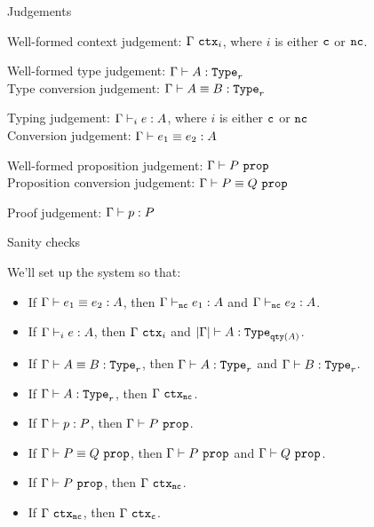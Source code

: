 \begin{frame}{Judgements}

Well-formed context judgement: $\ctx[i]{\Gamma}$, where $i$ is either $\texttt{c}$ or $\texttt{nc}$.

\vspace{2em}

Well-formed type judgement: $\type[\Gamma]{A}[r]$ \\
Type conversion judgement: $\typeconv[\Gamma]{A}{B}[r]$

\vspace{2em}

Typing judgement: $\typing[\Gamma][i]{e}{A}$, where $i$ is either $\texttt{c}$ or $\texttt{nc}$ \\
Conversion judgement: $\termconv[\Gamma]{e_1}{e_2}{A}$

\vspace{2em}

Well-formed proposition judgement: $\prop[\Gamma]{P}$ \\
Proposition conversion judgement: $\propconv[\Gamma]{P}{Q}$

\vspace{2em}

Proof judgement: $\proves[\Gamma]{p}{P}$

\end{frame}

\begin{frame}{Sanity checks}

We'll set up the system so that:

\begin{itemize}
  \item If $\termconv[\Gamma]{e_1}{e_2}{A}$, then $\typing[\Gamma][\noncomputable]{e_1}{A}$ and $\typing[\Gamma][\noncomputable]{e_2}{A}$.
  \item If $\typing[\Gamma][i]{e}{A}$, then $\ctx[i]{\Gamma}$ and $\type[\cartesianize{\Gamma}]{A}[\typeqty{A}]$.
  \item If $\typeconv[\Gamma]{A}{B}[r]$, then $\type[\Gamma]{A}[r]$ and $\type[\Gamma]{B}[r]$.
  \item If $\type[\Gamma]{A}[r]$, then $\ctx[\noncomputable]{\Gamma}$.
  \item If $\proves[\Gamma]{p}{P}$, then $\prop[\Gamma]{P}$.
  \item If $\propconv[\Gamma]{P}{Q}$, then $\prop[\Gamma]{P}$ and $\prop[\Gamma]{Q}$.
  \item If $\prop[\Gamma]{P}$, then $\ctx[\noncomputable]{\Gamma}$.
  \item If $\ctx[\noncomputable]{\Gamma}$, then $\ctx[\computable]{\Gamma}$.
\end{itemize}

\end{frame}